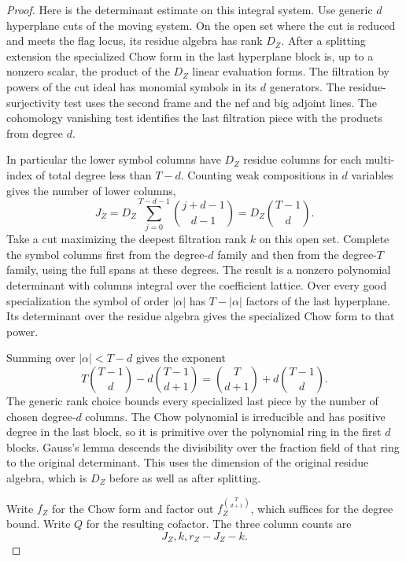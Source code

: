 \begin{proof}
Here is the determinant estimate on this integral
system. Use generic \(d\) hyperplane cuts of the
moving system. On the open set where the cut is reduced
and meets the flag locus, its residue algebra has rank
\(D_Z\). After a splitting extension the specialized
Chow form in the last hyperplane block is, up to a
nonzero scalar, the product of the \(D_Z\) linear
evaluation forms. The filtration by powers of the cut
ideal has monomial symbols in its \(d\) generators.
The residue-surjectivity test uses the second frame
and the nef and big adjoint lines. The cohomology
vanishing test identifies the last filtration piece
with the products from degree \(d\).

In particular
the lower symbol columns have \(D_Z\) residue columns
for each multi-index of total degree less than \(T-d\).
Counting weak compositions in \(d\) variables gives the number of lower columns,
\[
 J_Z=D_Z\sum_{j=0}^{T-d-1}\binom{j+d-1}{d-1}=D_Z\binom{T-1}{d}.
\]
Take a cut maximizing
the deepest filtration rank \(k\) on this open set. Complete
the symbol columns first from the degree-\(d\) family
and then from the degree-\(T\) family, using the full
spans at these degrees. The result is a nonzero
polynomial determinant with columns integral over the
coefficient lattice. Over every good specialization
the symbol of order \(|\alpha|\) has \(T-|\alpha|\)
factors of the last hyperplane. Its determinant over the
residue algebra gives the specialized Chow form to that
power.

Summing over \(|\alpha|<T-d\) gives the exponent
\[
 T\binom{T-1}{d}-d\binom{T-1}{d+1}
   =\binom{T}{d+1}+d\binom{T-1}{d}.
\]
The generic rank choice bounds every specialized last
piece by the number of chosen degree-\(d\) columns.
The Chow polynomial is irreducible and has positive degree
in the last block, so it is primitive over the polynomial
ring in the first \(d\) blocks. Gauss's lemma descends the
divisibility over the fraction field of that ring to the
original determinant. This uses the dimension of the original
residue algebra, which is \(D_Z\) before as well as
after splitting.
\label{cor:covolume-hilbert-samuel-3}

Write \(f_Z\) for the Chow form and factor out
\(f_Z^{\binom{T}{d+1}}\), which suffices for the degree bound.
Write \(Q\) for the resulting cofactor.
The three column counts are
\[
 J_Z,k,r_Z-J_Z-k.
\]


\end{proof}
